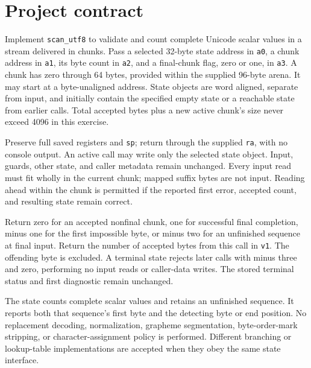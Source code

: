 \section*{Project contract}
Implement \texttt{scan\_utf8} to validate and count complete Unicode scalar values
in a stream delivered in chunks. Pass a selected 32-byte state address in
\texttt{a0}, a chunk address in \texttt{a1}, its byte count in \texttt{a2}, and a
final-chunk flag, zero or one, in \texttt{a3}. A chunk has zero through 64 bytes,
provided within the supplied 96-byte arena. It may start at a byte-unaligned address.
State objects are word aligned, separate from input, and initially contain the
specified empty state or a reachable state from earlier calls. Total accepted bytes
plus a new active chunk's size never exceed 4096 in this exercise.

Preserve full saved registers and \texttt{sp}; return through the supplied
\texttt{ra}, with no console output. An active call may write only the selected
state object. Input, guards, other state, and caller metadata remain unchanged.
Every input read must fit wholly in the current chunk; mapped suffix bytes are not
input. Reading ahead within the chunk is permitted if the reported first error,
accepted count, and resulting state remain correct.

Return zero for an accepted nonfinal chunk, one for successful final completion,
minus one for the first impossible byte, or minus two for an unfinished sequence
at final input. Return the number of accepted bytes from this call in \texttt{v1}.
The offending byte is excluded. A terminal state rejects later calls with minus
three and zero, performing no input reads or caller-data writes. The stored terminal
status and first diagnostic remain unchanged.

The state counts complete scalar values and retains an unfinished sequence. It
reports both that sequence's first byte and the detecting byte or end position.
No replacement decoding, normalization, grapheme segmentation, byte-order-mark
stripping, or character-assignment policy is performed. Different branching or
lookup-table implementations are accepted when they obey the same state interface.
